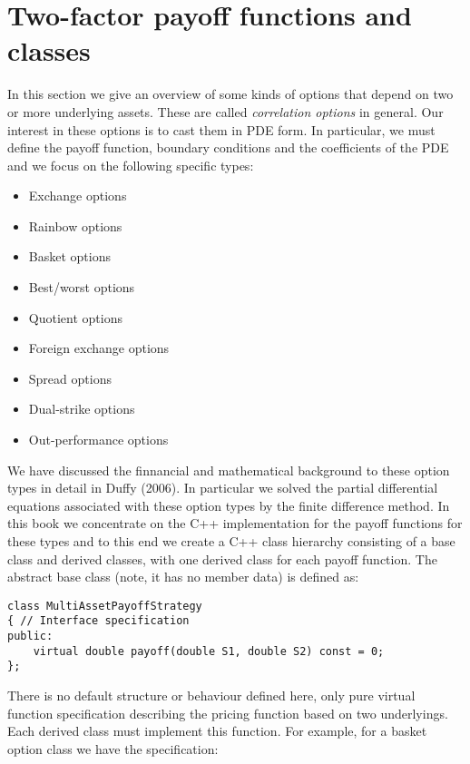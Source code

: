 \section{Two-factor payoff functions and classes}

In this section we give an overview of some kinds of options that depend on two or more underlying assets. These are called \emph{correlation options} in general. Our interest in these options is to cast them in PDE form. In particular, we must define the payoff function, boundary conditions and the coefficients of the PDE and we focus on the following specific types:
\begin{itemize}
	\item Exchange options
	\item Rainbow options
	\item Basket options
	\item Best/worst options
	\item Quotient options
	\item Foreign exchange options
	\item Spread options
	\item Dual-strike options
	\item Out-performance options
\end{itemize}
We have discussed the finnancial and mathematical background to these option types in detail in Duffy (2006). In particular we solved the partial differential equations associated with these option types by the finite difference method. In this book we concentrate on the C++ implementation for the payoff functions for these types and to this end we create a C++ class hierarchy consisting of a base class and derived classes, with one derived class for each payoff function. The abstract base class (note, it has no member data) is defined as:

\begin{lstlisting}
class MultiAssetPayoffStrategy
{ // Interface specification
public:
	virtual double payoff(double S1, double S2) const = 0;
};
\end{lstlisting}
There is no default structure or behaviour defined here, only pure virtual function specification describing the pricing function based on two underlyings. Each derived class must implement this function. For example, for a basket option class we have the specification:

